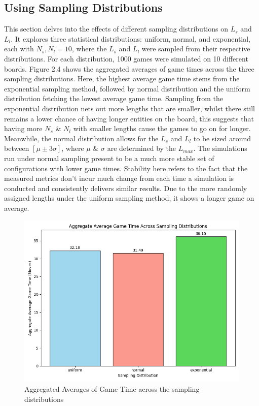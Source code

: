 \documentclass[12pt]{report}
\begin{document}
	\subsection{Using Sampling Distributions}
	This section delves into the effects of different sampling distributions on  $L_{s}$ and $L_{l}$. It explores three statistical distributions: uniform, normal, and exponential, each with $N_s, N_l=10$, where the  $L_{s}$ and $L_{l}$ were sampled from their respective distributions. For each distribution, 1000 games were simulated on 10 different boards. Figure 2.4 shows the aggregated averages of game times across the three sampling distributions. Here, the highest average game time stems from the exponential sampling method, followed by normal distribution and the uniform distribution fetching the lowest average game time. Sampling from the exponential distribution nets out more lengths that are smaller, whilst there still remains a lower chance of having longer entities on the board, this suggests that having more $N_s$ \& $N_l$ with smaller lengths cause the games to go on for longer. Meanwhile, the normal distribution allows for the $L_{s}$ and $L_{l}$ to be sized around between $[\mu \pm 3\sigma]$, where $\mu$ \& $\sigma$ are determined by the $L_{max}$. The simulations run under normal sampling present to be a much more stable set of configurations with lower game times. Stability here refers to the fact that the measured metrics don't incur much change from each time a simulation is conducted and consistently delivers similar results. Due to the more randomly assigned lengths under the uniform sampling method, it shows a longer game on average.
	\begin{figure}
		\centering
		\includegraphics[width=0.6\linewidth]{../withLength/FinalSampling/comparative_aggregate_average_game_times}
		\caption{Aggregated Averages of Game Time across the sampling distributions}
		\label{fig:comparativeaggregateaveragegametimes}
	\end{figure}
\end{document}
